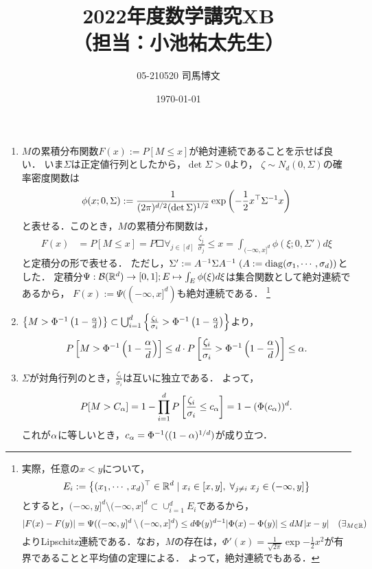 \documentclass[uplatex,dvipdfmx]{jsarticle}
\title{2022年度数学講究XB\\（担当：小池祐太先生）}
\author{05-210520 司馬博文}
\date{\today}
\begin{document}
\maketitle

\begin{enumerate}
    \item $M$の累積分布関数$F(x):=P[M\le x]$が絶対連続であることを示せば良い．
    いま$\Sigma$は正定値行列としたから，$\det\Sigma>0$より，
    $\zeta\sim N_d(0,\Sigma)$の確率密度関数は
    \[\phi(x;0,\Sigma):=\frac{1}{(2\pi)^{d/2}(\det\Sigma)^{1/2}}\exp\left(-\frac{1}{2}x^\top\Sigma^{-1}x\right)\]
    と表せる．このとき，$M$の累積分布関数は，
    \begin{align*}
        F(x)&=P[M\le x]=P\Square{\forall_{j\in[d]}\;\frac{\zeta_j}{\sigma_j}\le x}
        =\int_{(-\infty,x]^d}\phi(\xi;0,\Sigma')d\xi
    \end{align*}
    と定積分の形で表せる．
    ただし，$\Sigma':=A^{-1}\Sigma A^{-1}\;(A:=\mathrm{diag}(\sigma_1,\cdots,\sigma_d))$とした．
    定積分$\Psi:\mathcal{B}(\mathbb{R}^d)\to[0,1];E\mapsto\int_E\phi(\xi)d\xi$は集合関数として絶対連続であるから，
    $F(x):=\Psi((-\infty,x]^d)$も絶対連続である．
    \footnote{実際，任意の$x<y$について，
    \[E_i:=\left\{(x_1,\cdots,x_d)^\top\in\mathbb{R}^d\mid x_i\in[x,y],\;\forall_{j\ne i}\;x_j\in(-\infty,y]\right\}\]
    とすると，$(-\infty,y]^d\setminus(-\infty,x]^d\subset\cup_{i=1}^dE_i$であるから，
    \[\lvert F(x)-F(y)\rvert=\Psi((-\infty,y]^d\setminus(-\infty,x]^d)\le d\Phi(y)^{d-1}\lvert\Phi(x)-\Phi(y)\rvert\le dM\lvert x-y\rvert\quad(\exists_{M\in\mathbb{R}})\]
    よりLipschitz連続である．なお，$M$の存在は，$\Phi'(x)=\frac{1}{\sqrt{2\pi}}\exp{-\frac{1}{2}x^2}$が有界であることと平均値の定理による．
    よって，絶対連続でもある．}
    \item $\left\{M>\Phi^{-1}\left(1-\frac{\alpha}{d}\right)\right\}\subset\bigcup_{i=1}^d\left\{\frac{\zeta_i}{\sigma_i}>\Phi^{-1}\left(1-\frac{\alpha}{d}\right)\right\}$より，
    \[P\left[M>\Phi^{-1}\left(1-\frac{\alpha}{d}\right)\right]\le d\cdot P\left[\frac{\zeta_i}{\sigma_i}>\Phi^{-1}\left(1-\frac{\alpha}{d}\right)\right]\le\alpha.\]
    \item $\Sigma$が対角行列のとき，$\frac{\zeta_i}{\sigma_i}$は互いに独立である．
    よって，
    \[P[M>C_\alpha]=1-\prod^d_{i=1}P\left[\frac{\zeta_i}{\sigma_i}\le c_\alpha\right]=1-(\Phi(c_\alpha))^d.\]
    これが$\alpha$に等しいとき，$c_\alpha=\Phi^{-1}((1-\alpha)^{1/d})$が成り立つ．
\end{enumerate}
\end{document}
